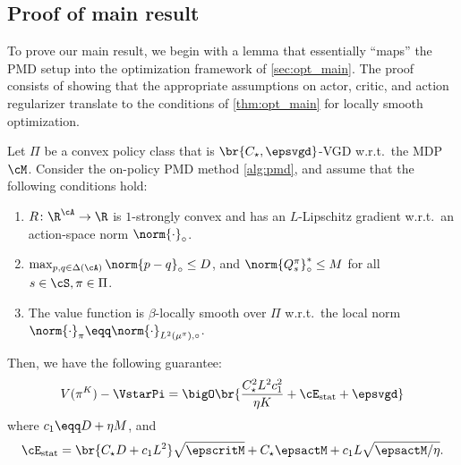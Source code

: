 \subsection{Proof of main result}
\label{sec:proof_main}
To prove our main result, we begin with a lemma that essentially ``maps'' the PMD setup into the optimization framework of \cref{sec:opt_main}. The proof consists of showing that the appropriate assumptions on actor, critic, and action regularizer translate to the conditions of \cref{thm:opt_main} for locally smooth optimization.
\begin{lemma}\label{lem:pmd_main}
    Let $\Pi$ be a convex policy class that is $\br{C_\star, \epsvgd}$-VGD w.r.t.~the MDP $\cM$.
    Consider the on-policy PMD method \cref{alg:pmd}, and assume that the following conditions hold:
    \begin{enumerate}[label=(\roman*)]
        \item \label{thmassm:pmd_main_R} $R\colon \R^{\cA} \to \R$ is $1$-strongly convex and has an $L$-Lipschitz gradient w.r.t.~an action-space norm $\norm{\cdot}_\circ$.
        
        \item \label{thmassm:pmd_main_DM} $\max_{p,q\in \Delta(\cA)}\norm{p  - q}_\circ\leq D$, and $\norm{Q_s^\pi}_\circ^*\leq M$ for all $s \in \cS, \pi\in \Pi$.
        
        \item \label{thmassm:pmd_main_smoothness} The value function is $\beta$-locally smooth over $\Pi$ w.r.t.~the local norm $\norm{\cdot}_\pi \eqq \norm{\cdot}_{L^2(\mu^\pi), \circ}$.
    \end{enumerate}
    Then, we have the following guarantee:
    \begin{align*}
        V(\pi^{K}) - \VstarPi
        = \bigO\br{
        \frac{C_\star^2 L^2 c_1^2}{\eta K}
        + \cE_{\rm stat}
        + \epsvgd
        }
    \end{align*}
    where $c_1 \eqq D + \eta M$, and
    \begin{align*}
        \cE_{\rm stat} = \br{C_\star D + c_1 L^2}\sqrt \epscritM
        + C_\star \epsactM
        + c_1 L \sqrt{\epsactM/\eta}.
    \end{align*}
\end{lemma}
